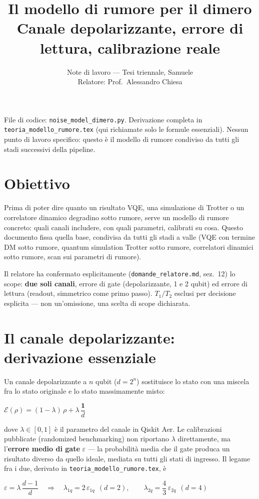 \documentclass[11pt,a4paper]{article}
\title{\vspace{-1.5em}\color{inkblue}Il modello di rumore per il dimero\\[0.2em]
\Large\normalfont\color{softgray}Canale depolarizzante, errore di lettura, calibrazione reale}
\author{Note di lavoro --- Tesi triennale, Samuele\\ Relatore: Prof.\ Alessandro Chiesa}
\date{}
\begin{document}
\sloppy
\maketitle
\thispagestyle{fancy}
\vspace{-2.0em}

File di codice: \texttt{noise\_model\_dimero.py}. Derivazione completa in
\texttt{teoria\_modello\_rumore.tex} (qui richiamate solo le formule
essenziali). Nessun punto di lavoro specifico: questo è il modello di
rumore condiviso da tutti gli stadi successivi della pipeline.

\tableofcontents

\section{Obiettivo}

Prima di poter dire quanto un risultato VQE, una simulazione di Trotter o
un correlatore dinamico degradino sotto rumore, serve un modello di
rumore concreto: quali canali includere, con quali parametri, calibrati
su cosa. Questo documento fissa quella base, condivisa da tutti gli
stadi a valle (VQE con termine DM sotto rumore, quantum simulation
Trotter sotto rumore, correlatori dinamici sotto rumore, scan sui
parametri di rumore).

Il relatore ha confermato esplicitamente (\texttt{domande\_relatore.md},
sez.~12) lo scope: \textbf{due soli canali}, errore di gate
(depolarizzante, 1 e 2 qubit) ed errore di lettura (readout, simmetrico
come primo passo). $T_1/T_2$ esclusi per decisione esplicita --- non
un'omissione, una scelta di scope dichiarata.

\section{Il canale depolarizzante: derivazione essenziale}

Un canale depolarizzante a $n$ qubit ($d=2^n$) sostituisce lo stato con
una miscela fra lo stato originale e lo stato massimamente misto:
\begin{keyeq}
\centering
$\mathcal{E}(\rho) = (1-\lambda)\,\rho + \lambda\,\dfrac{\mathbf{1}}{d}$
\end{keyeq}
dove $\lambda\in[0,1]$ è il parametro del canale in Qiskit Aer. Le
calibrazioni pubblicate (randomized benchmarking) non riportano $\lambda$
direttamente, ma l'\textbf{errore medio di gate} $\varepsilon$ ---
la probabilità media che il gate produca un risultato diverso da quello
ideale, mediata su tutti gli stati di ingresso. Il legame fra i due,
derivato in \texttt{teoria\_modello\_rumore.tex}, è
\begin{keyeq}
\centering
$\varepsilon = \lambda\,\dfrac{d-1}{d} \quad\Longrightarrow\quad
\lambda_{1q} = 2\,\varepsilon_{1q} \ \ (d=2), \qquad
\lambda_{2q} = \dfrac{4}{3}\,\varepsilon_{2q} \ \ (d=4)$
\end{keyeq}
\end{document}
